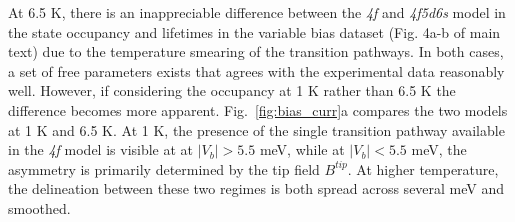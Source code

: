 \documentclass[reprint,amsmath,amssymb,aps,nofootinbib,onecolumn]{revtex4-2}
\begin{document}
At 6.5 K, there is an inappreciable difference between the \textit{4f} and \textit{4f5d6s} model in the state occupancy and lifetimes in the variable bias dataset (Fig. 4a-b of main text) due to the temperature smearing of the transition pathways. In both cases, a set of free parameters exists that agrees with the experimental data reasonably well. However, if considering the occupancy at 1 K rather than 6.5 K the difference becomes more apparent. Fig.~\ref{fig:bias_curr}a compares the two models at 1 K and 6.5 K. At 1 K, the presence of the single transition pathway available in the \textit{4f} model is visible at at $|V_b|>5.5$ meV, while at $|V_b|<5.5$ meV, the asymmetry is primarily determined by the tip field $B^{tip}$. At higher temperature, the delineation between these two regimes is both spread across several meV and smoothed.   




\end{document}
